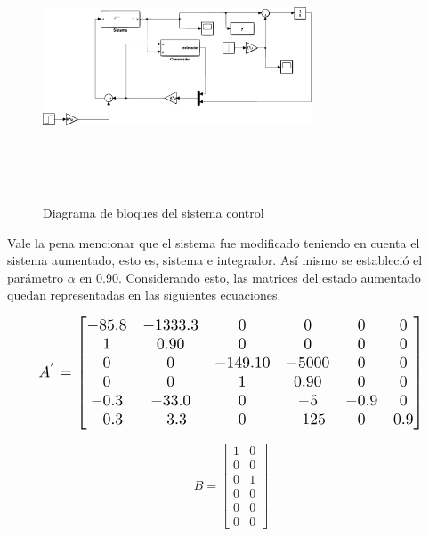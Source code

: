 \documentclass[journal,twoside,web]{ieeecolor}
\begin{document}
	\begin{figure}[h]
		\begin{center}
			\includegraphics[width=8cm,height=8cm,keepaspectratio]{optimalcontrol}
			\caption{ Diagrama de bloques del sistema control \label{control-system}}
		\end{center}
	\end{figure}

	Vale la pena mencionar que el sistema fue modificado teniendo en cuenta el sistema aumentado, esto es, sistema e integrador. Así mismo se estableció el parámetro $\alpha$ en 0.90. Considerando esto, las matrices del estado aumentado quedan representadas en las siguientes ecuaciones. 
	
	\begin{equation}
	\resizebox{0.9\hsize}{!}{$%
		A^{'} = \begin{bmatrix}
					-85.8 & -1333.3 & 0 & 0 & 0 & 0 \\
					1     & 0.90 & 0 & 0 & 0 & 0 \\
					0     & 0 & -149.10 & -5000 & 0 & 0 \\
					0     & 0 & 1 & 0.90 & 0 & 0 \\
					-0.3  & -33.0 & 0 & -5 & -0.9 & 0 \\
					-0.3  & -3.3 & 0 & -125 & 0 & 0.9 \\
				\end{bmatrix}
				$%
			}%
	\end{equation}
	
	\begin{equation}
		B = \begin{bmatrix}
				1 & 0 \\
				0 & 0 \\
				0 & 1 \\
				0 & 0 \\
				0 & 0 \\
				0 & 0 
			\end{bmatrix}
	\end{equation}
	
\end{document}
